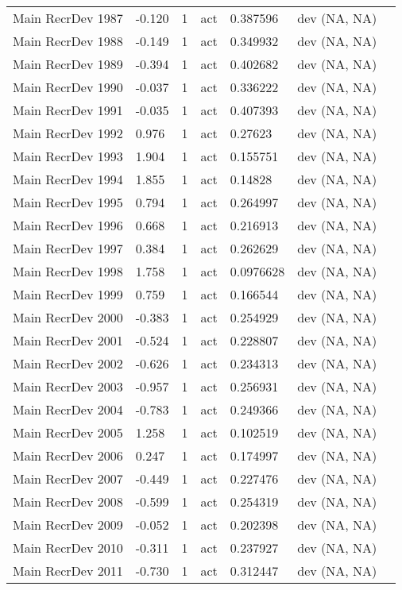 \documentclass[11pt,
  english,
  a4paper,
]{article}
\begin{document}
\begin{landscape}
\begin{longtable}[t]{>{\raggedright\arraybackslash}p{6cm}lllll>{\raggedright\arraybackslash}p{4cm}}
Main RecrDev 1987 & -0.120 & 1 & act & 0.387596 & dev (NA, NA)\\
Main RecrDev 1988 & -0.149 & 1 & act & 0.349932 & dev (NA, NA)\\
Main RecrDev 1989 & -0.394 & 1 & act & 0.402682 & dev (NA, NA)\\
Main RecrDev 1990 & -0.037 & 1 & act & 0.336222 & dev (NA, NA)\\
Main RecrDev 1991 & -0.035 & 1 & act & 0.407393 & dev (NA, NA)\\
Main RecrDev 1992 & 0.976 & 1 & act & 0.27623 & dev (NA, NA)\\
Main RecrDev 1993 & 1.904 & 1 & act & 0.155751 & dev (NA, NA)\\
Main RecrDev 1994 & 1.855 & 1 & act & 0.14828 & dev (NA, NA)\\
Main RecrDev 1995 & 0.794 & 1 & act & 0.264997 & dev (NA, NA)\\
Main RecrDev 1996 & 0.668 & 1 & act & 0.216913 & dev (NA, NA)\\
Main RecrDev 1997 & 0.384 & 1 & act & 0.262629 & dev (NA, NA)\\
Main RecrDev 1998 & 1.758 & 1 & act & 0.0976628 & dev (NA, NA)\\
Main RecrDev 1999 & 0.759 & 1 & act & 0.166544 & dev (NA, NA)\\
Main RecrDev 2000 & -0.383 & 1 & act & 0.254929 & dev (NA, NA)\\
Main RecrDev 2001 & -0.524 & 1 & act & 0.228807 & dev (NA, NA)\\
Main RecrDev 2002 & -0.626 & 1 & act & 0.234313 & dev (NA, NA)\\
Main RecrDev 2003 & -0.957 & 1 & act & 0.256931 & dev (NA, NA)\\
Main RecrDev 2004 & -0.783 & 1 & act & 0.249366 & dev (NA, NA)\\
Main RecrDev 2005 & 1.258 & 1 & act & 0.102519 & dev (NA, NA)\\
Main RecrDev 2006 & 0.247 & 1 & act & 0.174997 & dev (NA, NA)\\
Main RecrDev 2007 & -0.449 & 1 & act & 0.227476 & dev (NA, NA)\\
Main RecrDev 2008 & -0.599 & 1 & act & 0.254319 & dev (NA, NA)\\
Main RecrDev 2009 & -0.052 & 1 & act & 0.202398 & dev (NA, NA)\\
Main RecrDev 2010 & -0.311 & 1 & act & 0.237927 & dev (NA, NA)\\
Main RecrDev 2011 & -0.730 & 1 & act & 0.312447 & dev (NA, NA)\\

\end{longtable}
\end{landscape}
\end{document}
